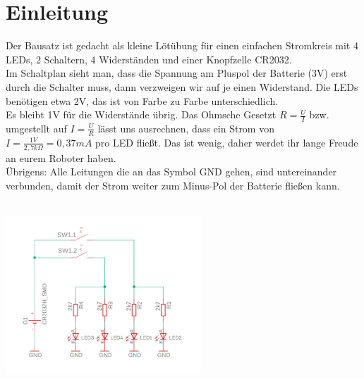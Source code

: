 \documentclass[a4paper]{article}
\begin{document}
\section{Einleitung}
Der Bausatz ist gedacht als kleine Lötübung für einen einfachen Stromkreis mit  4 LEDs, 2 Schaltern, 4 Widerständen und einer Knopfzelle CR2032.\\
Im Schaltplan sieht man, dass die Spannung am Pluspol der Batterie (3V) erst durch die Schalter muss, dann verzweigen wir auf je einen Widerstand. Die LEDs benötigen etwa 2V, das ist von Farbe zu Farbe unterschiedlich.\\ Es bleibt 1V für die Widerstände übrig. Das Ohmsche Gesetzt $R = \frac{U}{I}$ bzw. umgestellt auf $I = \frac{U}{R}$ lässt uns ausrechnen, dass ein Strom von $I = \frac{1V}{2,7 k\Omega} = 0,37 mA$ pro LED fließt. Das ist wenig, daher werdet ihr lange Freude an eurem Roboter haben.\\
Übrigens: Alle Leitungen die an das Symbol GND gehen, sind untereinander verbunden, damit der Strom weiter zum Minus-Pol der Batterie fließen kann.\\
\ \\
\begin{minipage}[t]{\textwidth}
  \centering
  \includegraphics[width=0.55\textwidth]{../pictures/Schematic}
  \label{img:Schematic}
\end{minipage}
\end{document}
